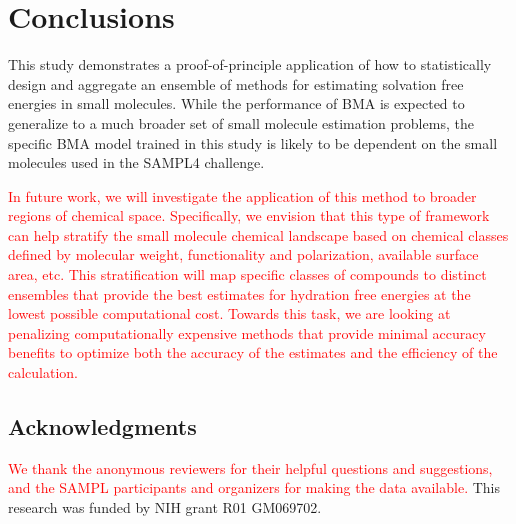 \documentclass[journal=jpcbfk, manuscript=article]{achemso}
\newcommand{\+}[1]{\ensuremath{\mathbf{#1}}}
\newcommand{\rev}[1]{\textsf{\textcolor{red}{#1}}}
\begin{document}
\section{Conclusions}
This study demonstrates a proof-of-principle application of how to statistically design and aggregate an ensemble of methods for estimating solvation free energies in small molecules.
While the performance of BMA is expected to generalize to a much broader set of small molecule estimation problems, the specific BMA model trained in this study is likely to be dependent on the small molecules used in the SAMPL4 challenge.

\rev{In future work, we will investigate the application of this method to broader regions of chemical space.
Specifically, we envision that this type of framework can help stratify the small molecule chemical landscape based on chemical classes defined by molecular weight, functionality and polarization, available surface area, etc.
This stratification will map specific classes of compounds to distinct ensembles that provide the best estimates for hydration free energies at the lowest possible computational cost.
Towards this task, we are looking at penalizing computationally expensive methods that provide minimal accuracy benefits to optimize both the accuracy of the estimates and the efficiency of the calculation.}

\subsection*{Acknowledgments}
\rev{We thank the anonymous reviewers for their helpful questions and suggestions, and the SAMPL participants and organizers for making the data available.} 
This research was funded by NIH grant R01 GM069702.


\end{document}
